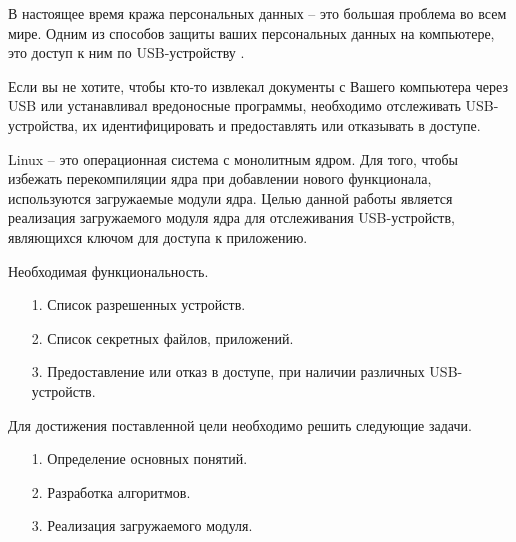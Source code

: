 \Introduction

\hfill

В настоящее время кража персональных данных -- это большая проблема во всем мире. Одним из способов защиты ваших персональных данных на компьютере, это доступ к ним по USB-устройству \cite{statcriminal}. 

Если вы не хотите, чтобы кто-то извлекал документы с Вашего компьютера через USB или устанавливал вредоносные программы, необходимо отслеживать USB-устройства, их идентифицировать и предоставлять или отказывать в доступе.

Linux -- это операционная система с монолитным ядром. Для того, чтобы избежать перекомпиляции ядра при добавлении нового функционала, используются загружаемые модули ядра.  Целью данной работы является реализация загружаемого модуля ядра для отслеживания USB-устройств, являющихся ключом для доступа к приложению.

Необходимая функциональность.
\begin{enumerate}
	\item[1. ]  Список разрешенных устройств.
	\item[2. ]  Список секретных файлов, приложений.
	\item[3. ]  Предоставление или отказ в доступе, при наличии различных USB-устройств.
\end{enumerate}
	
	Для достижения поставленной цели необходимо решить следующие задачи. 
	\begin{enumerate}
		\item[1. ] Определение основных понятий. 
		\item[2. ] Разработка алгоритмов. 
		\item[3. ] Реализация загружаемого модуля. 
	\end{enumerate}



